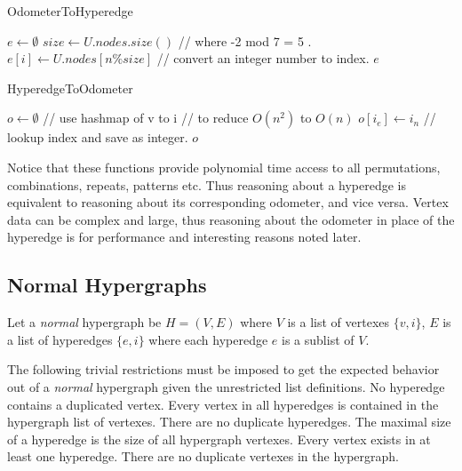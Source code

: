 \begin{algorithm}
	\caption{OdometerToHyperedge}\label{OtoE}
	\begin{algorithmic}[1]
		\State $e \gets \emptyset$
		\State $size \gets U.nodes.size()$
		\State // where -2 mod 7 = 5 .
		\State $e[i] \gets U.nodes[ n \% size ]$ // convert an integer number to index.
		\EndFor
		\State \Return $e$
		\EndFunction
	\end{algorithmic}
\end{algorithm}
\begin{algorithm}
	\caption{HyperedgeToOdometer}\label{EtoO}
	\begin{algorithmic}[1]
		\State $o \gets \emptyset$
		  // use hashmap of v to i
		 // to reduce $O(n^2)$ to $O(n)$
		\State $o[i_e] \gets i_n$ // lookup index and save as integer.
		\EndIf
		\EndFor
		\EndFor
		\State \Return $o$
		\EndFunction
	\end{algorithmic}
\end{algorithm}

Notice that these functions provide polynomial time access to all permutations, combinations, repeats, patterns etc. Thus reasoning about a hyperedge is equivalent to reasoning about its corresponding odometer, and vice versa. Vertex data can be complex and large, thus reasoning about the odometer in place of the hyperedge is for performance and interesting reasons noted later.
\newpage

\subsection{Normal Hypergraphs }
\begin{definition}
	
Let a \textit{normal} hypergraph \cite{berge1984hypergraphs} be $H = (V,E)$ where $V$ is a list of vertexes $\{v,i\}$, $E$ is a list of hyperedges $\{e,i\}$ where each hyperedge $e$ is a sublist of $V$.
\end{definition}

 The following trivial restrictions must be imposed to get the expected behavior out of a \textit{normal} hypergraph given the unrestricted list definitions. No hyperedge contains a duplicated vertex. Every vertex in all hyperedges is contained in the hypergraph list of vertexes. There are no duplicate hyperedges. The maximal size of a hyperedge is the size of all hypergraph vertexes. Every vertex exists in at least one hyperedge. There are no duplicate vertexes in the hypergraph.\\


